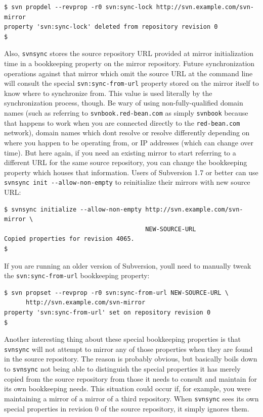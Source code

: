 \begin{verbatim}
$ svn propdel --revprop -r0 svn:sync-lock http://svn.example.com/svn-mirror
property 'svn:sync-lock' deleted from repository revision 0
$
\end{verbatim}

Also, \texttt{svnsync} stores the source repository URL provided at
mirror initialization time in a bookkeeping property on the mirror
repository. Future synchronization operations against that mirror which
omit the source URL at the command line will consult the special
\texttt{svn:sync-from-url} property stored on the mirror itself to know
where to synchronize from. This value is used literally by the
synchronization process, though. Be wary of using non-fully-qualified
domain names (such as referring to \texttt{svnbook.red-bean.com} as
simply \texttt{svnbook} because that happens to work when you are
connected directly to the \texttt{red-bean.com} network), domain names
which don\textquotesingle t resolve or resolve differently depending on
where you happen to be operating from, or IP addresses (which can change
over time). But here again, if you need an existing mirror to start
referring to a different URL for the same source repository, you can
change the bookkeeping property which houses that information. Users of
Subversion 1.7 or better can use
\texttt{svnsync\ init\ -\/-allow-non-empty} to reinitialize their
mirrors with new source URL:

\begin{verbatim}
$ svnsync initialize --allow-non-empty http://svn.example.com/svn-mirror \
                                       NEW-SOURCE-URL
Copied properties for revision 4065.
$
\end{verbatim}

If you are running an older version of Subversion,
you\textquotesingle ll need to manually tweak the
\texttt{svn:sync-from-url} bookkeeping property:

\begin{verbatim}
$ svn propset --revprop -r0 svn:sync-from-url NEW-SOURCE-URL \
      http://svn.example.com/svn-mirror
property 'svn:sync-from-url' set on repository revision 0
$
\end{verbatim}

Another interesting thing about these special bookkeeping properties is
that \texttt{svnsync} will not attempt to mirror any of those properties
when they are found in the source repository. The reason is probably
obvious, but basically boils down to \texttt{svnsync} not being able to
distinguish the special properties it has merely copied from the source
repository from those it needs to consult and maintain for its own
bookkeeping needs. This situation could occur if, for example, you were
maintaining a mirror of a mirror of a third repository. When
\texttt{svnsync} sees its own special properties in revision 0 of the
source repository, it simply ignores them.

